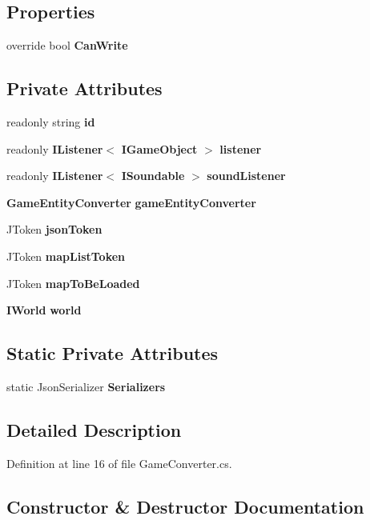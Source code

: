 \subsection*{Properties}
\begin{DoxyCompactItemize}
\item 
override bool \textbf{ Can\+Write}\hspace{0.3cm}{\ttfamily  [get]}
\end{DoxyCompactItemize}
\subsection*{Private Attributes}
\begin{DoxyCompactItemize}
\item 
readonly string \textbf{ id}
\item 
readonly \textbf{ I\+Listener}$<$ \textbf{ I\+Game\+Object} $>$ \textbf{ listener}
\item 
readonly \textbf{ I\+Listener}$<$ \textbf{ I\+Soundable} $>$ \textbf{ sound\+Listener}
\item 
\textbf{ Game\+Entity\+Converter} \textbf{ game\+Entity\+Converter}
\item 
J\+Token \textbf{ json\+Token}
\item 
J\+Token \textbf{ map\+List\+Token}
\item 
J\+Token \textbf{ map\+To\+Be\+Loaded}
\item 
\textbf{ I\+World} \textbf{ world}
\end{DoxyCompactItemize}
\subsection*{Static Private Attributes}
\begin{DoxyCompactItemize}
\item 
static Json\+Serializer \textbf{ Serializers}
\end{DoxyCompactItemize}


\subsection{Detailed Description}


Definition at line 16 of file Game\+Converter.\+cs.



\subsection{Constructor \& Destructor Documentation}
\mbox{\label{classMelloMario_1_1LevelGen_1_1JsonConverters_1_1GameConverter_aa985f3e4a95545a308e10c9777a25380}} 
